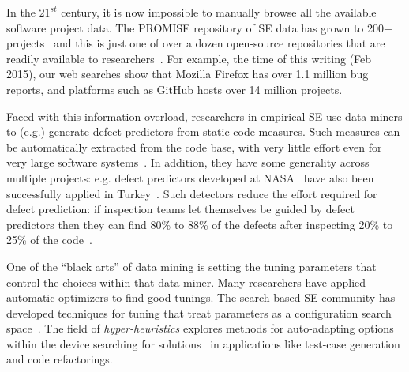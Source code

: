\documentclass{sig-alternative}
\begin{document}

In the $21^{st}$ century, it is now impossible
to manually browse all the available software project
data. The PROMISE repository of SE data has grown to 200+ projects~\cite{promise15}
and this is just one of over a dozen open-source repositories
that are readily available to researchers~\cite{rod12}.
For example,  the time of this writing (Feb  2015), our web searches show that Mozilla Firefox has over 1.1 million bug reports, and platforms such as GitHub hosts over 14 million projects. 



 
Faced with this information overload,
researchers in empirical SE
use  data miners  to (e.g.) generate 
defect predictors from static code measures.
Such   measures can be
automatically extracted from the code base, with very little effort
even for very large software systems~\cite{nagappan05}. 
In addition, they have  some generality
across multiple projects: e.g. defect
predictors developed at NASA~\cite{me07b} have also been successfully
applied in Turkey~\cite{tosun09}.
Such detectors reduce the effort required for 
defect prediction: if 
inspection teams let themselves be guided by defect predictors then
they can find 80\% to 88\% of the defects
after inspecting  20\% to 25\% of the code~\cite{ostrand04,tosun10}.


One of the ``black arts'' of data mining is setting the tuning
parameters that control  the choices within that data miner.
Many researchers have applied automatic optimizers to find good tunings.
The search-based SE community has   developed techniques
for tuning that treat parameters  as a configuration
search space~\cite{cora10,Krogmann10}. 
The field of {\em hyper-heuristics} explores methods for auto-adapting
options within the device searching for solutions~\cite{jia2013learning} in applications
like test-case generation and code refactorings.
\end{document}
